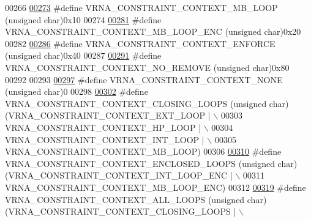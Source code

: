 \begin{DoxyCode}
00266 
\mbox{\hyperlink{group__hard__constraints_ga456ecd2ff00056bb64da8dd4f61bbfc5}{00273}} \textcolor{preprocessor}{#define VRNA\_CONSTRAINT\_CONTEXT\_MB\_LOOP       (unsigned char)0x10}
00274 
\mbox{\hyperlink{group__hard__constraints_ga02a3d703ddbcfce393e4bbfcb9db7077}{00281}} \textcolor{preprocessor}{#define VRNA\_CONSTRAINT\_CONTEXT\_MB\_LOOP\_ENC   (unsigned char)0x20}
00282 
\mbox{\hyperlink{constraints__hard_8h_a1aa55f2c6347e670e003b1a765632dad}{00286}} \textcolor{preprocessor}{#define VRNA\_CONSTRAINT\_CONTEXT\_ENFORCE       (unsigned char)0x40}
00287 
\mbox{\hyperlink{constraints__hard_8h_a9fcac36535850ff612c7e6b1305304a1}{00291}} \textcolor{preprocessor}{#define VRNA\_CONSTRAINT\_CONTEXT\_NO\_REMOVE     (unsigned char)0x80}
00292 
00293 
\mbox{\hyperlink{constraints__hard_8h_addb99fd07ad9acc0201fd07eada8f661}{00297}} \textcolor{preprocessor}{#define VRNA\_CONSTRAINT\_CONTEXT\_NONE          (unsigned char)0}
00298 
\mbox{\hyperlink{constraints__hard_8h_a10675929fdc14c5f81df49d77933067a}{00302}} \textcolor{preprocessor}{#define VRNA\_CONSTRAINT\_CONTEXT\_CLOSING\_LOOPS (unsigned char)(VRNA\_CONSTRAINT\_CONTEXT\_EXT\_LOOP | \(\backslash\)}
00303 \textcolor{preprocessor}{                                                              VRNA\_CONSTRAINT\_CONTEXT\_HP\_LOOP | \(\backslash\)}
00304 \textcolor{preprocessor}{                                                              VRNA\_CONSTRAINT\_CONTEXT\_INT\_LOOP | \(\backslash\)}
00305 \textcolor{preprocessor}{                                                              VRNA\_CONSTRAINT\_CONTEXT\_MB\_LOOP)}
00306 
\mbox{\hyperlink{constraints__hard_8h_ae03ed6ba25cf3cefdf36516e4081eb17}{00310}} \textcolor{preprocessor}{#define VRNA\_CONSTRAINT\_CONTEXT\_ENCLOSED\_LOOPS  (unsigned char)(VRNA\_CONSTRAINT\_CONTEXT\_INT\_LOOP\_ENC | \(\backslash\)}
00311 \textcolor{preprocessor}{                                                                VRNA\_CONSTRAINT\_CONTEXT\_MB\_LOOP\_ENC)}
00312 
\mbox{\hyperlink{group__hard__constraints_ga886d9127c49bb982a4b67cd7581e8a5a}{00319}} \textcolor{preprocessor}{#define VRNA\_CONSTRAINT\_CONTEXT\_ALL\_LOOPS     (unsigned char)(VRNA\_CONSTRAINT\_CONTEXT\_CLOSING\_LOOPS | \(\backslash\)}

\end{DoxyCode}
